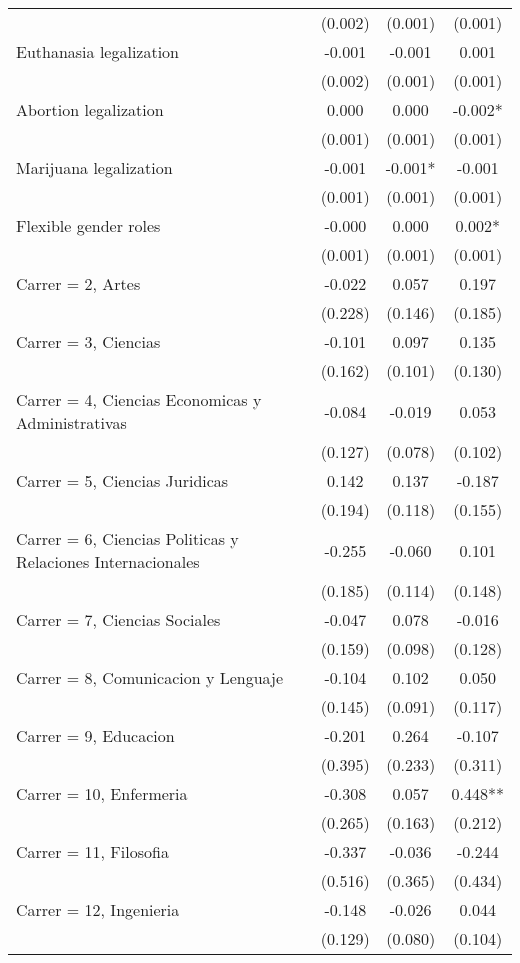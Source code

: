 \documentclass[]{article}
\begin{document}
\begin{tabular}{lccc}
 & (0.002) & (0.001) & (0.001) \\
Euthanasia legalization & -0.001 & -0.001 & 0.001 \\
 & (0.002) & (0.001) & (0.001) \\
Abortion legalization & 0.000 & 0.000 & -0.002* \\
 & (0.001) & (0.001) & (0.001) \\
Marijuana legalization & -0.001 & -0.001* & -0.001 \\
 & (0.001) & (0.001) & (0.001) \\
Flexible gender roles & -0.000 & 0.000 & 0.002* \\
 & (0.001) & (0.001) & (0.001) \\
Carrer = 2, Artes & -0.022 & 0.057 & 0.197 \\
 & (0.228) & (0.146) & (0.185) \\
Carrer = 3, Ciencias & -0.101 & 0.097 & 0.135 \\
 & (0.162) & (0.101) & (0.130) \\
Carrer = 4, Ciencias Economicas y Administrativas & -0.084 & -0.019 & 0.053 \\
 & (0.127) & (0.078) & (0.102) \\
Carrer = 5, Ciencias Juridicas & 0.142 & 0.137 & -0.187 \\
 & (0.194) & (0.118) & (0.155) \\
Carrer = 6, Ciencias Politicas y Relaciones Internacionales & -0.255 & -0.060 & 0.101 \\
 & (0.185) & (0.114) & (0.148) \\
Carrer = 7, Ciencias Sociales & -0.047 & 0.078 & -0.016 \\
 & (0.159) & (0.098) & (0.128) \\
Carrer = 8, Comunicacion y Lenguaje & -0.104 & 0.102 & 0.050 \\
 & (0.145) & (0.091) & (0.117) \\
Carrer = 9, Educacion & -0.201 & 0.264 & -0.107 \\
 & (0.395) & (0.233) & (0.311) \\
Carrer = 10, Enfermeria & -0.308 & 0.057 & 0.448** \\
 & (0.265) & (0.163) & (0.212) \\
Carrer = 11, Filosofia & -0.337 & -0.036 & -0.244 \\
 & (0.516) & (0.365) & (0.434) \\
Carrer = 12, Ingenieria & -0.148 & -0.026 & 0.044 \\
 & (0.129) & (0.080) & (0.104) \\

\end{tabular}
\end{document}
